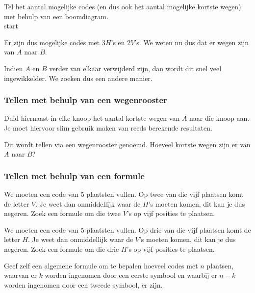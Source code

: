 \documentclass[12pt,twoside]{article}
\begin{document}
\begin{theorie}
Tel het aantal mogelijke codes (en dus ook het aantal mogelijke kortste wegen) met behulp van een boomdiagram.\\

\vspace*{5cm}
start
\vspace*{5cm}

Er zijn dus \arule{3cm} mogelijke codes met 3$H$'s en 2$V$'s. We weten nu dus dat er \arule{3cm} wegen zijn van $A$ naar $B$.

Indien $A$ en $B$ verder van elkaar verwijderd zijn, dan wordt dit snel veel ingewikkelder. We zoeken dus een andere manier.

\pagebreak
\subsubsection{Tellen met behulp van een wegenrooster}

\begin{multicols}{2}
\begin{center}
\end{center}  

Duid hiernaast in elke knoop het aantal kortste wegen van $A$ naar die knoop aan. Je moet hiervoor slim gebruik maken van reeds berekende resultaten.
\end{multicols}
Dit wordt tellen via een wegenrooster genoemd. Hoeveel kortste wegen zijn er van $A$ naar $B$?

\subsubsection{Tellen met behulp van een formule}

We moeten een code van 5 plaatsten vullen. Op twee van die vijf plaatsen komt de letter $V$. Je weet dan onmiddellijk waar de $H$'s moeten komen, dit kan je dus negeren. Zoek een formule om die twee $V$'s op vijf posities te plaatsen.

We moeten een code van 5 plaatsten vullen. Op drie van die vijf plaatsen komt de letter $H$. Je weet dan onmiddellijk waar de $V$'s moeten komen, dit kan je dus negeren. Zoek een formule om die drie $H$'s op vijf posities te plaatsen.

Geef zelf een algemene formule om te bepalen hoeveel codes met $n$ plaatsen, waarvan er $k$ worden ingenomen door een eerste symbool en waarbij er $n-k$ worden ingenomen door een tweede symbool, er zijn.

\end{theorie}
\end{document}
